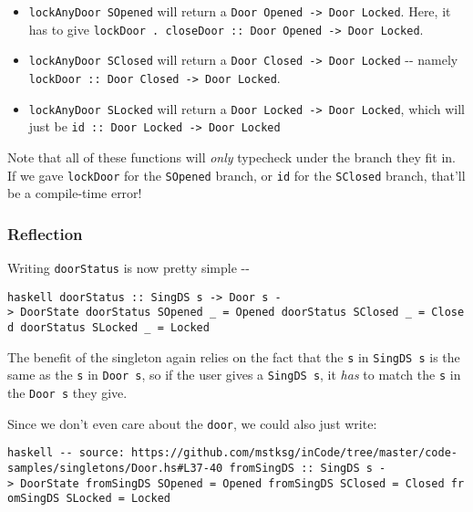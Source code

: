 \documentclass[]{article}
\begin{document}
\begin{itemize}
\item
  \texttt{lockAnyDoor\ SOpened} will return a
  \texttt{Door\ \textquotesingle{}Opened\ -\textgreater{}\ Door\ \textquotesingle{}Locked}.
  Here, it has to give
  \texttt{lockDoor\ .\ closeDoor\ ::\ Door\ \textquotesingle{}Opened\ -\textgreater{}\ Door\ \textquotesingle{}Locked}.
\item
  \texttt{lockAnyDoor\ SClosed} will return a
  \texttt{Door\ \textquotesingle{}Closed\ -\textgreater{}\ Door\ \textquotesingle{}Locked}
  -\/- namely
  \texttt{lockDoor\ ::\ Door\ \textquotesingle{}Closed\ -\textgreater{}\ Door\ \textquotesingle{}Locked}.
\item
  \texttt{lockAnyDoor\ SLocked} will return a
  \texttt{Door\ \textquotesingle{}Locked\ -\textgreater{}\ Door\ \textquotesingle{}Locked},
  which will just be
  \texttt{id\ ::\ Door\ \textquotesingle{}Locked\ -\textgreater{}\ Door\ \textquotesingle{}Locked}
\end{itemize}

Note that all of these functions will \emph{only} typecheck under the branch
they fit in. If we gave \texttt{lockDoor} for the \texttt{SOpened} branch, or
\texttt{id} for the \texttt{SClosed} branch, that'll be a compile-time error!

\subsubsection{Reflection}

Writing \texttt{doorStatus} is now pretty simple -\/-

\texttt{haskell\ doorStatus\ ::\ SingDS\ s\ -\textgreater{}\ Door\ s\ -\textgreater{}\ DoorState\ doorStatus\ SOpened\ \_\ =\ Opened\ doorStatus\ SClosed\ \_\ =\ Closed\ doorStatus\ SLocked\ \_\ =\ Locked}

The benefit of the singleton again relies on the fact that the \texttt{s} in
\texttt{SingDS\ s} is the same as the \texttt{s} in \texttt{Door\ s}, so if the
user gives a \texttt{SingDS\ s}, it \emph{has} to match the \texttt{s} in the
\texttt{Door\ s} they give.

Since we don't even care about the \texttt{door}, we could also just write:

\texttt{haskell\ -\/-\ source:\ https://github.com/mstksg/inCode/tree/master/code-samples/singletons/Door.hs\#L37-40\ fromSingDS\ ::\ SingDS\ s\ -\textgreater{}\ DoorState\ fromSingDS\ SOpened\ =\ Opened\ fromSingDS\ SClosed\ =\ Closed\ fromSingDS\ SLocked\ =\ Locked}
\end{document}
